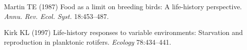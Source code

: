 \documentclass{pnastwo}
\begin{document}
\begin{article}


%
%



%





%
%
%
%
%


% 
\footnotesize{
\begin{thebibliography}{10}

Martin TE
\newblock (1987) {Food as a limit on breeding birds: A life-history
  perspective}.
\newblock \emph{Annu. Rev. Ecol. Syst.} 18:453--487.

Kirk KL
\newblock (1997) {Life-history responses to variable environments: Starvation
  and reproduction in planktonic rotifers}.
\newblock \emph{Ecology} 78:434--441.


\end{thebibliography}}
\end{article}
\end{document}

